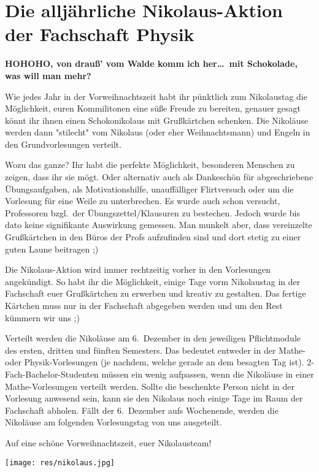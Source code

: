 \section{Die alljährliche Nikolaus-Aktion der Fachschaft Physik}
\begin{multicols}{2}
\textbf{HOHOHO, von drauß' vom Walde komm ich her\dots\
	mit Schokolade, was will man mehr?}

Wie jedes Jahr in der Vorweihnachtszeit habt ihr pünktlich zum Nikolaustag die Möglichkeit, euren Kommilitonen eine süße Freude zu bereiten, genauer gesagt könnt ihr ihnen einen Schokonikolaus mit Grußkärtchen schenken. 
Die Nikoläuse werden dann "stilecht"  vom Nikolaus (oder eher Weihnachtsmann) und Engeln in den Grundvorlesungen verteilt.

Wozu das ganze? Ihr habt die perfekte Möglichkeit, besonderen Menschen zu zeigen, dass ihr sie mögt. Oder alternativ auch als Dankeschön für abgeschriebene Übungsaufgaben, als Motivationshilfe, 
unauffälliger Flirtversuch oder um die Vorlesung für eine Weile zu unterbrechen. Es wurde auch schon versucht, Professoren bzgl.\ der Übungszettel/Klausuren zu bestechen. 
Jedoch wurde bis dato keine signifikante Auswirkung gemessen. Man munkelt aber, dass vereinzelte Grußkärtchen in den Büros der Profs aufzufinden sind und dort stetig zu einer guten Laune beitragen ;)

Die Nikolaus-Aktion wird immer rechtzeitig vorher in den Vorlesungen angekündigt. So habt ihr die Möglichkeit, einige Tage vorm Nikolaustag in der Fachschaft euer Grußkärtchen zu erwerben und kreativ zu gestalten. 
Das fertige Kärtchen muss nur in der Fachschaft abgegeben werden und um den Rest kümmern wir uns ;)

Verteilt werden die Nikoläuse am 6.~Dezember in den jeweiligen Pflichtmodule des ersten, dritten und fünften Semesters. Das bedeutet entweder in der Mathe- oder Physik-Vorlesungen (je nachdem, welche gerade an dem besagten Tag ist).
2-Fach-Bachelor-Studenten müssen ein wenig aufpassen, wenn die Nikoläuse in einer Mathe-Vorlesungen verteilt werden.
Sollte die beschenkte Person nicht in der Vorlesung anwesend sein, kann sie den Nikolaus noch einige Tage im Raum der Fachschaft abholen.
Fällt der 6.~Dezember aufs Wochenende, werden die Nikoläuse am folgenden Vorlesungstag von uns ausgeteilt.

Auf eine schöne Vorweihnachtszeit, euer Nikolausteam!

\end{multicols}

\vspace{\fill}
\begin{center}
	\texttt{[image: res/nikolaus.jpg]}
\end{center}
